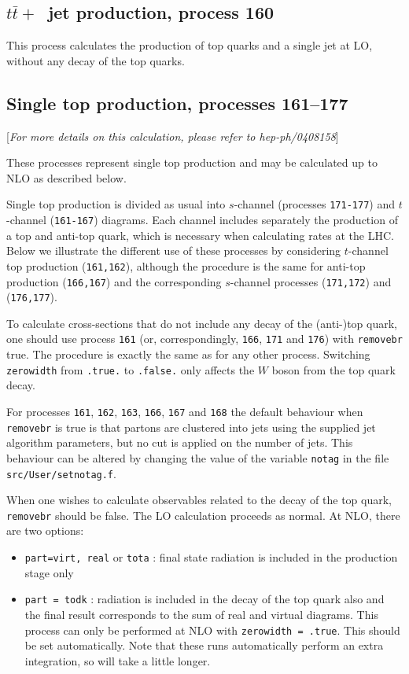 \documentclass{article}
\begin{document}
{{{{{{\subsection{$t{\bar t}+$~jet production, process 160}
This process calculates the production of top quarks and a single jet
at LO, without any decay of the top quarks.

\subsection{Single top production, processes 161--177}
\label{subsec:stop}

\begin{center}
[{\it For more details on this calculation, please refer to hep-ph/0408158}]
\end{center}

These processes represent single top production and may be calculated up to
NLO as described below.

Single top production is divided as usual into $s$-channel 
(processes {\tt 171-177}) and $t$-channel ({\tt 161-167})
diagrams. Each channel includes separately the production of a top
and anti-top quark, which is necessary when calculating rates at the LHC.
Below we illustrate the different use of these processes by considering
$t$-channel top production ({\tt 161,162}), although the procedure is the same
for anti-top production ({\tt 166,167}) and the corresponding $s$-channel
processes ({\tt 171,172}) and ({\tt 176,177}).


To calculate cross-sections that do not include any decay of the (anti-)top
quark, one should use process {\tt 161}
(or, correspondingly, {\tt 166}, {\tt 171} and {\tt 176}) with {\tt removebr}
true. The procedure is exactly the same
as for any other process.
Switching {\tt zerowidth} from {\tt .true.} to {\tt .false.} only affects
the $W$ boson from the top quark decay.

For processes {\tt 161}, {\tt 162}, {\tt 163}, {\tt 166}, {\tt 167}
and {\tt 168} the default behaviour when {\tt removebr} is true is that
partons are clustered into jets using the supplied jet
algorithm parameters, but no cut is applied on the number of jets.
This behaviour can be altered by changing the value of the
variable {\tt notag} in the file {\tt src/User/setnotag.f}.
 
When one wishes to calculate observables related to the decay of the top
quark, {\tt removebr} should be false.
The LO calculation proceeds as normal. At NLO, there are two options:
\begin{itemize}
\item {\tt part=virt, real} or {\tt tota} : final state radiation is included
in the production stage only
\item {\tt part = todk} : radiation is included in the decay of the top
quark also and the final result corresponds to the sum of real and virtual
diagrams. This process can only be performed at NLO with 
{\tt zerowidth = .true}. This should be set automatically.
Note that these runs automatically perform an extra integration, so
will take a little longer.
\end{itemize}

}}}}}}
\end{document}
